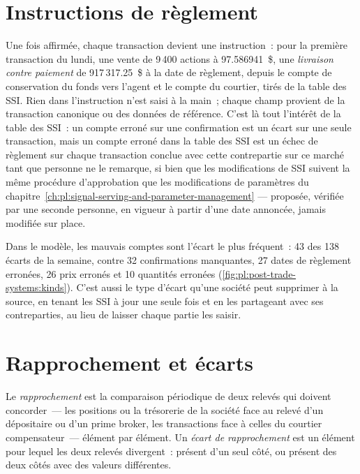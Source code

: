 \section{Instructions de règlement}

Une fois affirmée, chaque transaction devient une instruction~: pour la première transaction du lundi, une vente de 9\,400 actions à 97.586941~\$, une \emph{livraison contre
paiement} de 917\,317.25~\$ à la date de règlement, depuis le compte de conservation du fonds vers l'agent et le compte du courtier, tirés de la table des SSI.
Rien dans l'instruction n'est saisi à la main~; chaque champ provient de la transaction canonique ou des données de référence. C'est là tout l'intérêt de la table des SSI~: un
compte erroné sur une confirmation est un écart sur une seule transaction, mais un compte erroné dans la table des SSI est un échec de règlement sur chaque transaction conclue avec cette
contrepartie sur ce marché tant que personne ne le remarque, si bien que les modifications de SSI suivent la même procédure d'approbation que les modifications de paramètres du
chapitre~\ref{ch:pl:signal-serving-and-parameter-management} --- proposée, vérifiée par une seconde personne, en vigueur à partir d'une date annoncée, jamais
modifiée sur place.

Dans le modèle, les mauvais comptes sont l'écart le plus fréquent~: 43 des 138 écarts de la semaine, contre 32 confirmations manquantes, 27
dates de règlement erronées, 26 prix erronés et 10 quantités erronées (\cref{fig:pl:post-trade-systems:kinds}). C'est aussi le type d'écart qu'une société peut
supprimer à la source, en tenant les SSI à jour une seule fois et en les partageant avec ses contreparties, au lieu de laisser chaque partie les saisir.

\section{Rapprochement et écarts}

\begin{definition}\label{def:pl:post-trade-systems:recon}
Le \emph{rapprochement} est la comparaison périodique de deux relevés qui doivent concorder~--- les positions ou la trésorerie de la société
face au relevé d'un dépositaire ou d'un prime broker, les transactions face à celles du courtier compensateur~--- élément par élément. Un \emph{écart
de rapprochement} est un élément pour lequel les deux relevés divergent~: présent d'un seul côté, ou présent des deux côtés avec des valeurs différentes.
\end{definition}

